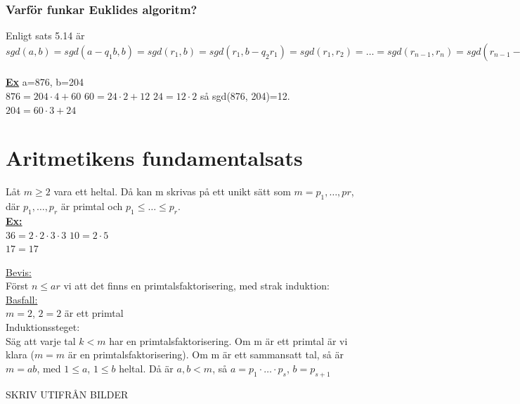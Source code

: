 \documentclass{article}
\begin{document}
    \subsubsection{Varför funkar Euklides algoritm?}
    Enligt sats 5.14 är $sgd(a,b)=sgd(a-q_{1}b,b)=sgd(r_{1},b)=sgd(r_{1},b-q_{2}r_{1})=sgd(r_{1},r_{2})=\ldots=sgd(r_{n-1},r_{n})=sgd(r_{n-1}-r_{n}q_{n+1},r_{n})=sgd(0,r_{n})=r_{n}$\\
    \\
    \underline{\textbf{Ex}} a=876, b=204\\
    \indent $876=204\cdot 4+60$
    \indent $60=24\cdot 2+12$
    \indent $24=12\cdot 2$
    \indent så sgd(876, 204)=12.
    \indent $204=60\cdot 3+24$

    \section{Aritmetikens fundamentalsats}
    Låt $m\geq 2$ vara ett heltal. Då kan m skrivas på ett unikt sätt som $m=p_{1}, \ldots , p{r}$, där $p_{1}, \ldots , p_{r}$ är primtal och $p_{1}\leq \ldots \leq p_{r}$.\\
    \underline{\textbf{Ex:}}\\
    \indent $36=2\cdot 2\cdot 3\cdot 3$
    \indent $10=2\cdot 5$\\
    \indent $17=17$
    \begin{tabbing}
        \underline{Bevis:}\=\\
        \>Först $n\leq ar$ vi att det finns en primtalsfaktorisering, med strak induktion:\\
        \>\underline{Basfall:}\=\\
        \>\>$m=2$, $2=2$ är ett primtal\\
        \>Induktionssteget:\\
        \>\>Säg att varje tal $k<m$ har en primtalsfaktorisering. 
        Om m är ett primtal är vi klara ($m=m$ är en primtalsfaktorisering).
        Om m är ett sammansatt tal, så är $m=ab$, med $1\leq a$, $1\leq b$ heltal.
        Då är $a,b<m$, så $a=p_{1}\cdot \ldots \cdot p_{s}$, $b=p_{s+1}$
    \end{tabbing}

    SKRIV UTIFRÅN BILDER
    \clearpage
\end{document}
